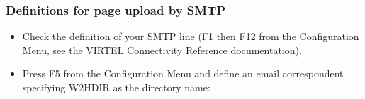 \documentclass[letterpaper,10pt,english]{sphinxmanual}
\begin{document}
\ignorespaces 

\subsubsection{Definitions for page upload by SMTP}
\label{\detokenize{audit_operations_ and_performance:definitions-for-page-upload-by-smtp}}\label{\detokenize{audit_operations_ and_performance:index-70}}\begin{itemize}
\item {} 
\sphinxAtStartPar
Check the definition of your SMTP line (F1 then F12 from the Configuration Menu, see the VIRTEL Connectivity Reference documentation).

\item {} 
\sphinxAtStartPar
Press F5 from the Configuration Menu and define an e\sphinxhyphen{}mail correspondent specifying W2H\sphinxhyphen{}DIR as the directory name:

\end{itemize}
\end{document}
